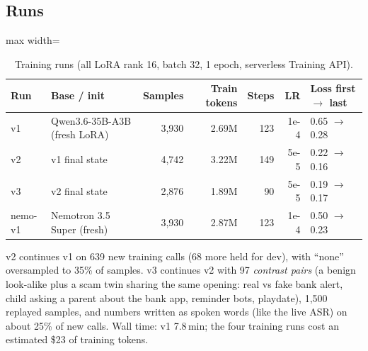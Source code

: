 \documentclass[11pt]{article}
\begin{document}
\subsection{Runs}
\begin{table}[H]\centering\small
\caption{Training runs (all LoRA rank 16, batch 32, 1 epoch, serverless Training API).}\label{tab:runs}
\begin{adjustbox}{max width=\linewidth}\begin{tabular}{llrrrrl}\toprule
Run & Base / init & Samples & Train tokens & Steps & LR & Loss first $\to$ last \\ \midrule
v1 & Qwen3.6-35B-A3B (fresh LoRA) & 3,930 & 2.69M & 123 & 1e-4 & 0.65 $\to$ 0.28 \\
v2 & v1 final state & 4,742 & 3.22M & 149 & 5e-5 & 0.22 $\to$ 0.16 \\
v3 & v2 final state & 2,876 & 1.89M & 90 & 5e-5 & 0.19 $\to$ 0.17 \\
nemo-v1 & Nemotron 3.5 Super (fresh) & 3,930 & 2.87M & 123 & 1e-4 & 0.50 $\to$ 0.23 \\
\bottomrule\end{tabular}\end{adjustbox}
\par\smallskip\footnotesize v2 continues v1 on 639 new training calls (68 more held for dev), with ``none'' oversampled to 35\% of samples. v3 continues v2 with 97 \emph{contrast pairs} (a benign look-alike plus a scam twin sharing the same opening: real vs fake bank alert, child asking a parent about the bank app, reminder bots, playdate), 1,500 replayed samples, and numbers written as spoken words (like the live ASR) on about 25\% of new calls. Wall time: v1 7.8\,min; the four training runs cost an estimated \$23 of training tokens.
\end{table}
\end{document}
